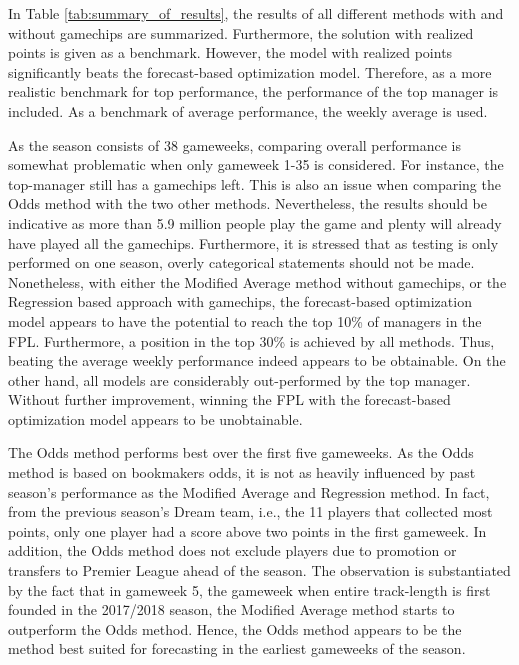 In Table \ref{tab:summary_of_results}, the results of all different methods with and without gamechips are summarized. Furthermore, the solution with realized points is given as a benchmark. However, the model with realized points significantly beats the forecast-based optimization model. Therefore, as a more realistic benchmark for top performance, the performance of the top manager is included. As a benchmark of average performance, the weekly average is used.

\newpar

As the season consists of 38 gameweeks, comparing overall performance is somewhat problematic when only gameweek 1-35 is considered. For instance, the top-manager still has a gamechips left. This is also an issue when comparing the Odds method with the two other methods. Nevertheless, the results should be indicative as more than 5.9 million people play the game and plenty will already have played all the gamechips. Furthermore, it is stressed that as testing is only performed on one season, overly categorical statements should not be made. Nonetheless, with either the Modified Average method without gamechips, or the Regression based approach with gamechips, the forecast-based optimization model appears to have the potential to reach the top 10\% of managers in the FPL. Furthermore, a position in the top 30\% is achieved by all methods. Thus, beating the average weekly performance indeed appears to be obtainable. On the other hand, all models are considerably out-performed by the top manager. Without further improvement, winning the FPL with the forecast-based optimization model appears to be unobtainable.

\newpar

The Odds method performs best over the first five gameweeks. As the Odds method is based on bookmakers odds, it is not as heavily influenced by past season's performance as the Modified Average and Regression method. In fact, from the previous season's Dream team, i.e., the 11 players that collected most points, only one player had a score above two points in the first gameweek. In addition, the Odds method does not exclude players due to promotion or transfers to Premier League ahead of the season. The observation is substantiated by the fact that in gameweek 5, the gameweek when entire track-length is first founded in the 2017/2018 season, the Modified Average method starts to outperform the Odds method. Hence, the Odds method appears to be the method best suited for forecasting in the earliest gameweeks of the season.


